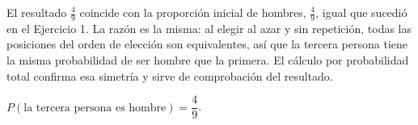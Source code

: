 \documentclass[11pt]{article}
\begin{document}
\begin{nota}
El resultado $\tfrac49$ coincide con la proporción inicial de hombres, $\tfrac{4}{9}$, igual que sucedió en el Ejercicio 1. La razón es la misma: al elegir al azar y sin repetición, todas las posiciones del orden de elección son equivalentes, así que la tercera persona tiene la misma probabilidad de ser hombre que la primera. El cálculo por probabilidad total confirma esa simetría y sirve de comprobación del resultado.
\end{nota}

\begin{resp}
$P(\text{la tercera persona es hombre})=\dfrac{4}{9}$.
\end{resp}
\end{document}
